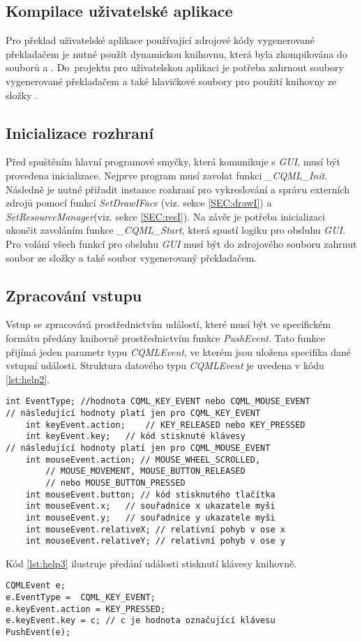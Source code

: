 \documentclass{article}
\begin{document}
\subsection{Kompilace uživatelské aplikace}
Pro překlad uživatelské aplikace používající zdrojové kódy vygenerované překladačem je nutné použít dynamickou knihovnu, která byla zkompilována do souborů  a . Do~projektu pro uživatelskou aplikaci je potřeba zahrnout soubory vygenerované překladačem a také hlavičkové soubory pro použití knihovny ze složky .
\subsection{Inicializace rozhraní}
Před spuštěním hlavní programové smyčky, která komunikuje s \textit{GUI}, musí být provedena inicializace. Nejprve program musí zavolat funkci \textit{\_CQML\_Init}. Následně je nutné přiřadit instance rozhraní pro vykreslování a správu externích zdrojů pomocí funkcí \textit{SetDrawIFace} (viz. sekce \ref{SEC:drawI}) a \textit{SetResourceManager}(viz. sekce \ref{SEC:resI}). Na závěr je potřeba inicializaci ukončit zavoláním funkce \textit{\_CQML\_Start}, která spustí logiku pro obsluhu \textit{GUI}. Pro volání všech funkcí pro obsluhu \textit{GUI} musí být do zdrojového souboru zahrnut soubor  ze složky  a také soubor  vygenerovaný překladačem.
\subsection{Zpracování vstupu}
Vstup se zpracovává prostřednictvím událostí, které musí být ve specifickém formátu předány knihovně prostřednictvím funkce \textit{PushEvent}. Tato funkce přijímá jeden parametr typu \textit{CQMLEvent}, ve kterém jsou uložena specifika dané vstupní události. Struktura datového typu \textit{CQMLEvent} je uvedena v kódu \ref{lst:help2}.
\begin{lstlisting}[frame=single,caption=Struktura datového typu \textit{CQMLEvent}.,label=lst:help2]
int EventType; //hodnota CQML_KEY_EVENT nebo CQML_MOUSE_EVENT
// následující hodnoty platí jen pro CQML_KEY_EVENT
	int keyEvent.action;	// KEY_RELEASED nebo KEY_PRESSED
	int keyEvent.key;	// kód stisknuté klávesy
// následující hodnoty platí jen pro CQML_MOUSE_EVENT
	int mouseEvent.action; // MOUSE_WHEEL_SCROLLED, 
		// MOUSE_MOVEMENT, MOUSE_BUTTON_RELEASED 
		// nebo MOUSE_BUTTON_PRESSED
	int mouseEvent.button; // kód stisknutého tlačítka
	int mouseEvent.x;	// souřadnice x ukazatele myši
	int mouseEvent.y;	// souřadnice y ukazatele myši
	int mouseEvent.relativeX; // relativní pohyb v ose x
	int mouseEvent.relativeY; // relativní pohyb v ose y
\end{lstlisting}
Kód \ref{lst:help3} ilustruje předání události stisknutí klávesy knihovně.
\begin{lstlisting}[float,frame=single,caption=Předání vstupu z klávesnice knihovně.,label=lst:help3]
CQMLEvent e;
e.EventType =  CQML_KEY_EVENT;
e.keyEvent.action = KEY_PRESSED;
e.keyEvent.key = c; // c je hodnota označující klávesu
PushEvent(e);
\end{lstlisting}
\end{document}
